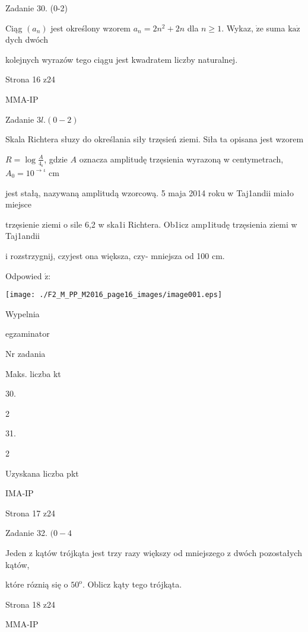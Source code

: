 \documentclass[a4paper,12pt]{article}
\begin{document}
Zadanie 30. (0-2)

Ciąg $(a_{n})$ jest określony wzorem $a_{n}=2n^{2}+2n$ dla $n\geq 1$. Wykaz, $\dot{\mathrm{z}}\mathrm{e}$ suma $\mathrm{k}\mathrm{a}\dot{\mathrm{z}}$ dych dwóch

kolejnych wyrazów tego ciągu jest kwadratem liczby naturalnej.

Strona 16 z24

MMA-IP





Zadanie $3l. (0-2)$

Skala Richtera słuz$\mathrm{y}$ do określania siły trzęsień ziemi. Siła ta opisana jest wzorem

$R=\displaystyle \log\frac{A}{4_{\mathfrak{c}}}$, gdzie $A$ oznacza amplitudę trzęsienia wyrazoną w centymetrach, $A_{0}=10^{\rightarrow\iota}$ cm

jest stałą, nazywaną amplitudą wzorcową. 5 maja 2014 roku w Taj1andii miało miejsce

trzęsienie ziemi o sile 6,2 w ska1i Richtera. Ob1icz amp1itudę trzęsienia ziemi w Taj1andii

i rozstrzygnij, czyjest ona większa, czy- mniejsza od 100 cm.

Odpowied $\acute{\mathrm{z}}$:
\begin{center}
\texttt{[image: ./F2\_M\_PP\_M2016\_page16\_images/image001.eps]}
\end{center}
Wypelnia

egzaminator

Nr zadania

Maks. liczba kt

30.

2

31.

2

Uzyskana liczba pkt

IMA-IP

Strona 17 z24





Zadanie 32. $(0-4$

Jeden z kątów trójkąta jest trzy razy większy od mniejszego z dwóch pozostałych kątów,

które róznią się o $50^{\mathrm{o}}$. Oblicz kąty tego trójkąta.

Strona 18 z24

MMA-IP
\end{document}
